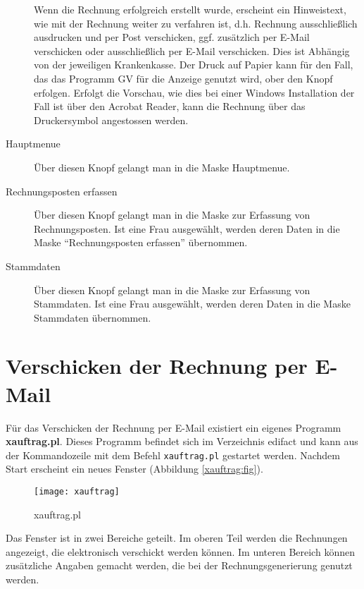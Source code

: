 \begin{description}
Wenn die Rechnung erfolgreich erstellt wurde, erscheint ein
Hinweistext, wie mit der Rechnung weiter zu verfahren ist, d.h.
Rechnung ausschließlich ausdrucken und per Post verschicken, ggf. zusätzlich
per E-Mail verschicken oder ausschließlich per E-Mail verschicken.
Dies ist Abhängig von der jeweiligen Krankenkasse.
Der Druck auf Papier kann für den Fall, das das Programm GV für die 
Anzeige genutzt wird, ober den Knopf  erfolgen.
Erfolgt die Vorschau, wie dies bei einer Windows Installation der Fall
ist über den Acrobat Reader, kann die Rechnung über das Druckersymbol
angestossen werden.
\item[Hauptmenue] 
Über diesen Knopf gelangt man in die Maske Hauptmenue.
\item[Rechnungsposten erfassen] 
Über diesen Knopf gelangt man in die Maske
zur Erfassung von Rechnungsposten. Ist eine Frau ausgewählt, werden deren
Daten in die Maske ``Rechnungsposten erfassen'' übernommen.
\item[Stammdaten]
Über diesen Knopf gelangt man in die Maske
zur Erfassung von Stammdaten. Ist eine Frau ausgewählt, werden deren
Daten in die Maske Stammdaten übernommen.
\end{description}


\section{Verschicken der Rechnung per E-Mail\label{elekrechnung:kap}}
Für das Verschicken der Rechnung per E-Mail existiert ein eigenes
Programm \textbf{xauftrag.pl}. Dieses Programm befindet sich im Verzeichnis
edifact und kann aus der Kommandozeile mit dem Befehl \verb|xauftrag.pl| gestartet
werden. Nachdem Start erscheint ein neues Fenster 
(Abbildung \vref{xauftrag:fig}).

\begin{figure}[ht]
\centering
\texttt{[image: xauftrag]}
\caption{xauftrag.pl\label{xauftrag:fig}}
\end{figure}

Das Fenster ist in zwei Bereiche geteilt. Im oberen Teil werden die
Rechnungen angezeigt, die elektronisch verschickt werden können.
Im unteren Bereich können zusätzliche Angaben gemacht werden, die bei
der Rechnungsgenerierung genutzt werden.

